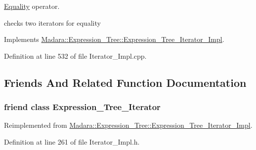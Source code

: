 \hyperlink{classMadara_1_1Expression__Tree_1_1Equality}{Equality} operator. 

checks two iterators for equality 

Implements \hyperlink{classMadara_1_1Expression__Tree_1_1Expression__Tree__Iterator__Impl_a05aaa44a9c047b7863789792d8d7830a}{Madara::Expression\_\-Tree::Expression\_\-Tree\_\-Iterator\_\-Impl}.



Definition at line 532 of file Iterator\_\-Impl.cpp.



\subsection{Friends And Related Function Documentation}
\hypertarget{classMadara_1_1Expression__Tree_1_1Level__Order__Expression__Tree__Iterator__Impl_adfe8d209b4dd64ac100d4c9c9adf08c1}{
\subsubsection[{Expression\_\-Tree\_\-Iterator}]{\setlength{\rightskip}{0pt plus 5cm}friend class {\bf Expression\_\-Tree\_\-Iterator}}}
\label{dc/de7/classMadara_1_1Expression__Tree_1_1Level__Order__Expression__Tree__Iterator__Impl_adfe8d209b4dd64ac100d4c9c9adf08c1}


Reimplemented from \hyperlink{classMadara_1_1Expression__Tree_1_1Expression__Tree__Iterator__Impl_adfe8d209b4dd64ac100d4c9c9adf08c1}{Madara::Expression\_\-Tree::Expression\_\-Tree\_\-Iterator\_\-Impl}.



Definition at line 261 of file Iterator\_\-Impl.h.

